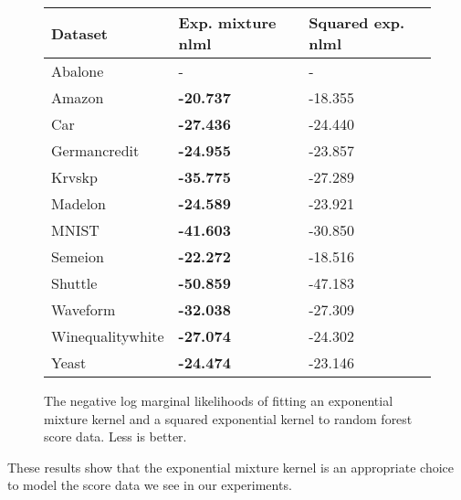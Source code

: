 \documentclass[a4paper,12pt,twoside,openright]{report}
\begin{document}
\begin{figure}
\centering

\begin{tabular}{|l|l|l|}
\hline
Dataset          & Exp. mixture nlml & Squared exp. nlml \\ \hline\hline
Abalone          & -                 & -                 \\ \hline
Amazon           & \textbf{-20.737}  & -18.355           \\ \hline
Car              & \textbf{-27.436}  & -24.440           \\ \hline
Germancredit     & \textbf{-24.955}  & -23.857           \\ \hline
Krvskp           & \textbf{-35.775}  & -27.289           \\ \hline
Madelon          & \textbf{-24.589}  & -23.921           \\ \hline
MNIST            & \textbf{-41.603}  & -30.850           \\ \hline
Semeion          & \textbf{-22.272}  & -18.516           \\ \hline
Shuttle          & \textbf{-50.859}  & -47.183           \\ \hline
Waveform         & \textbf{-32.038}  & -27.309           \\ \hline
Winequalitywhite & \textbf{-27.074}  & -24.302           \\ \hline
Yeast            & \textbf{-24.474}  & -23.146           \\ \hline
\end{tabular}
	\caption{The negative log marginal likelihoods of fitting an exponential mixture kernel and a squared exponential kernel to random forest score data. Less is better.}
\label{rnd_forest_fits}

\end{figure}


These results show that the exponential mixture kernel is an appropriate choice to model the score data we see in our experiments.



\end{document}
